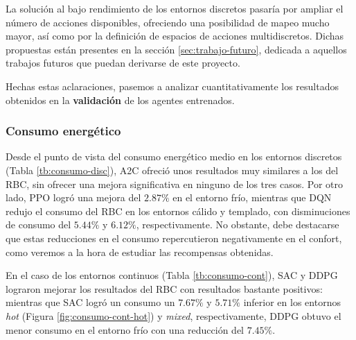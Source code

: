 La solución al bajo rendimiento de los entornos discretos pasaría por ampliar el número de acciones disponibles, ofreciendo una posibilidad de mapeo mucho mayor, así como por la definición de espacios de acciones multidiscretos. Dichas propuestas están presentes en la sección \ref{sec:trabajo-futuro}, dedicada a aquellos trabajos futuros que puedan derivarse de este proyecto.

Hechas estas aclaraciones, pasemos a analizar cuantitativamente los resultados obtenidos en la \textbf{validación} de los agentes entrenados.

\subsubsection{Consumo energético}

Desde el punto de vista del consumo energético medio en los entornos discretos (Tabla \ref{tb:consumo-disc}), A2C ofreció unos resultados muy similares a los del RBC, sin ofrecer una mejora significativa en ninguno de los tres casos. Por otro lado, PPO logró una mejora del $2.87\%$ en el entorno frío, mientras que DQN redujo el consumo del RBC en los entornos cálido y templado, con disminuciones de consumo del $5.44\%$ y $6.12\%$, respectivamente. No obstante, debe destacarse que estas reducciones en el consumo repercutieron negativamente en el confort, como veremos a la hora de estudiar las recompensas obtenidas.

En el caso de los entornos continuos (Tabla \ref{tb:consumo-cont}), SAC y DDPG lograron mejorar los resultados del RBC con resultados bastante positivos: mientras que SAC logró un consumo un $7.67\%$ y $5.71\%$ inferior en los entornos \textit{hot} (Figura \ref{fig:consumo-cont-hot}) y \textit{mixed}, respectivamente, DDPG obtuvo el menor consumo en el entorno frío con una reducción del $7.45\%$.

\begin{table}
    \centering
    \caption{Consumo medio de los agentes entrenados en entornos discretos a lo largo de 20 episodios de validación}
    \label{tb:consumo-disc}
\end{table}

